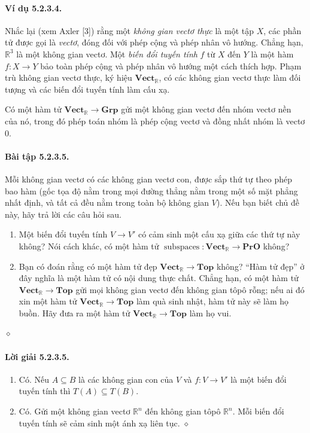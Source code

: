 \paragraph{Ví dụ 5.2.3.4.} Nhắc lại (xem Axler [3]) rằng một \emph{không gian vectơ thực} là một tập $X$, các phần tử được gọi là \emph{vectơ}, đóng đối với phép cộng và phép nhân vô hướng. Chẳng hạn, $\mathbb R^3$ là một không gian vectơ. Một \emph{biến đổi tuyến tính} $f$ từ $X$ đến $Y$ là một hàm $f:X\to Y$ bảo toàn phép cộng và phép nhân vô hướng một cách thích hợp. Phạm trù không gian vectơ thực, ký hiệu $\mathbf{Vect}_{\mathbb R}$, có các không gian vectơ thực làm đối tượng và các biến đổi tuyến tính làm cấu xạ.

Có một hàm tử $\mathbf{Vect}_{\mathbb R}\to\mathbf{Grp}$ gửi một không gian vectơ đến nhóm vectơ nền của nó, trong đó phép toán nhóm là phép cộng vectơ và đồng nhất nhóm là vectơ $0$.
\paragraph{Bài tập 5.2.3.5.} Mỗi không gian vectơ có các không gian vectơ con, được sắp thứ tự theo phép bao hàm (gốc tọa độ nằm trong mọi đường thẳng nằm trong một số mặt phẳng nhất định, và tất cả đều nằm trong toàn bộ không gian $V$). Nếu bạn biết chủ đề này, hãy trả lời các câu hỏi sau.
\begin{enumerate}[label=\alph*.]
\item Một biến đổi tuyến tính $V\to V'$ có cảm sinh một cấu xạ giữa các thứ tự này không? Nói cách khác, có một hàm tử $\operatorname{subspaces}:\mathbf{Vect}_{\mathbb R}\to\mathbf{PrO}$ không?
\item Bạn có đoán rằng có một hàm tử đẹp $\mathbf{Vect}_{\mathbb R}\to\mathbf{Top}$ không? ``Hàm tử đẹp'' ở đây nghĩa là một hàm tử có nội dung thực chất. Chẳng hạn, có một hàm tử $\mathbf{Vect}_{\mathbb R}\to\mathbf{Top}$ gửi mọi không gian vectơ đến không gian tôpô rỗng; nếu ai đó xin một hàm tử $\mathbf{Vect}_{\mathbb R}\to\mathbf{Top}$ làm quà sinh nhật, hàm tử này sẽ làm họ buồn. Hãy đưa ra một hàm tử $\mathbf{Vect}_{\mathbb R}\to\mathbf{Top}$ làm họ vui.
\end{enumerate}\hfill$\diamond$
\paragraph{Lời giải 5.2.3.5.}
\begin{enumerate}[label=\alph*.]
\item Có. Nếu $A\subseteq B$ là các không gian con của $V$ và $f:V\to V'$ là một biến đổi tuyến tính thì $T(A)\subseteq T(B)$.
\item Có. Gửi một không gian vectơ $\mathbb R^n$ đến không gian tôpô $\mathbb R^n$. Mỗi biến đổi tuyến tính sẽ cảm sinh một ánh xạ liên tục.
\nobreak\hfill$\diamond$
\end{enumerate}

